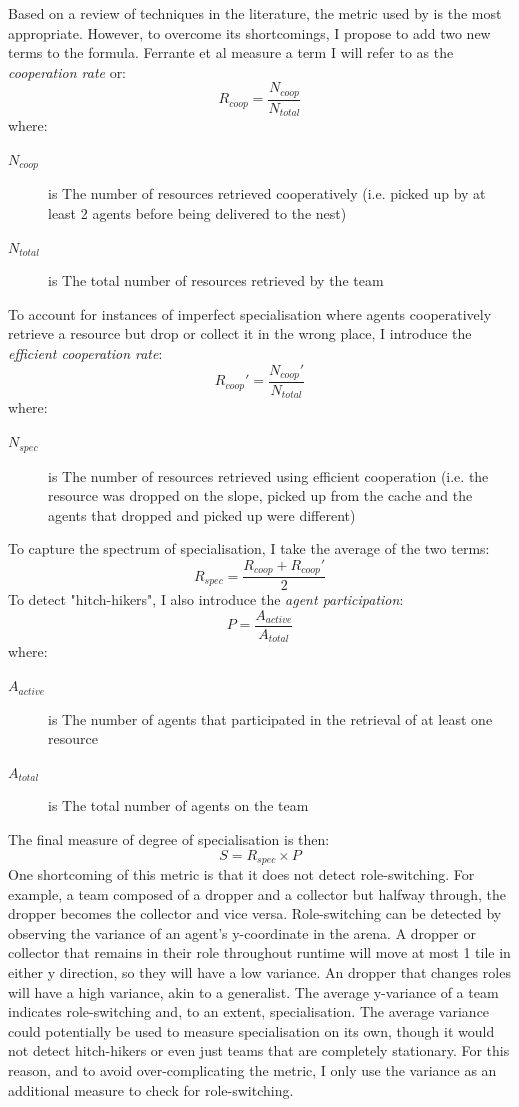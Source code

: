 \documentclass[12pt]{article}
\begin{document}
Based on a review of techniques in the literature, the metric used by \cite{ferrante:PLoSCB:2015} is the most appropriate. However, to overcome its shortcomings, I propose to add two new terms to the formula. Ferrante et al measure a term I will refer to as the \textit{cooperation rate} or:\\
%
\[ 
R_{coop} = \frac{N_{coop}}{N_{total}}
\]
where:
\begin{description}
\item[$N_{coop}$] is The number of resources retrieved cooperatively (i.e. picked up by at least 2 agents before being delivered to the nest)
\item[$N_{total}$] is The total number of resources retrieved by the team
\end{description}
%
To account for instances of imperfect specialisation where agents cooperatively retrieve a resource but drop or collect it in the wrong place, I introduce the \textit{efficient cooperation rate}:
%
\[ 
R_{coop}' = \frac{N_{coop}'}{N_{total}}
\]
where:
\begin{description}
\item[$N_{spec}$] is The number of resources retrieved using efficient cooperation (i.e. the resource was dropped on the slope, picked up from the cache and the agents that dropped and picked up were different)
\end{description}
%
To capture the spectrum of specialisation, I take the average of the two terms:
%
\[ 
R_{spec} = \frac{R_{coop} + R_{coop}'}{2}
\]
%
To detect "hitch-hikers", I also introduce the \textit{agent participation}:
%
\[ 
P = \frac{A_{active}}{A_{total}}
\]
where:
\begin{description}
\item[$A_{active}$] is The number of agents that participated in the retrieval of at least one resource
\item[$A_{total}$] is The total number of agents on the team
\end{description}
%
The final measure of degree of specialisation is then:
%
\[ 
S = R_{spec} \times P
\]
%
One shortcoming of this metric is that it does not detect role-switching. For example, a team composed of a dropper and a collector but halfway through, the dropper becomes the collector and vice versa. Role-switching can be detected by observing the variance of an agent's y-coordinate in the arena. A dropper or collector that remains in their role throughout runtime will move at most 1 tile in either y direction, so they will have a low variance. An dropper that changes roles will have a high variance, akin to a generalist. The average y-variance of a team indicates role-switching and, to an extent, specialisation. The average variance could potentially be used to measure specialisation on its own, though it would not detect hitch-hikers or even just teams that are completely stationary. For this reason, and to avoid over-complicating the metric, I only use the variance as an additional measure to check for role-switching.
\end{document}

